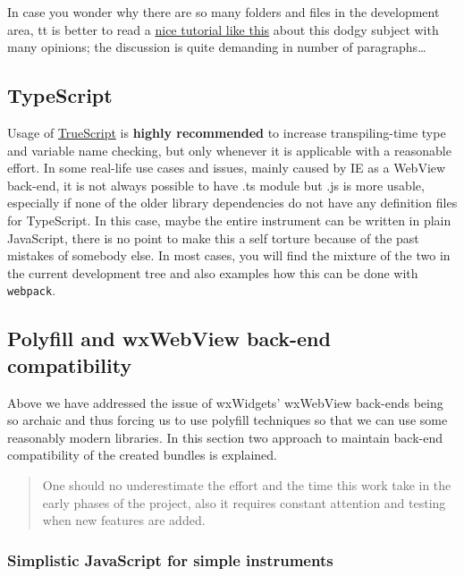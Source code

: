 \documentclass[11pt]{article}
\begin{document}
    In case you wonder why there are so many folders and files in the
development area, tt is better to read a
\href{https://medium.com/dev-bits/everything-i-know-about-writing-modular-javascript-applications-37c125d8eddf}{nice
tutorial like this} about this dodgy subject with many opinions; the
discussion is quite demanding in number of paragraphs\ldots{}

    \hypertarget{typescript}{%
\subsection{TypeScript}\label{typescript}}

    Usage of \href{https://www.typescriptlang.org/}{TrueScript} is
\textbf{highly recommended} to increase transpiling-time type and
variable name checking, but only whenever it is applicable with a
reasonable effort. In some real-life use cases and issues, mainly caused
by IE as a WebView back-end, it is not always possible to have .ts
module but .js is more usable, especially if none of the older library
dependencies do not have any definition files for TypeScript. In this
case, maybe the entire instrument can be written in plain JavaScript,
there is no point to make this a self torture because of the past
mistakes of somebody else. In most cases, you will find the mixture of
the two in the current development tree and also examples how this can
be done with \texttt{webpack}.

    \hypertarget{polyfill-and-wxwebview-back-end-compatibility}{%
\subsection{Polyfill and wxWebView back-end
compatibility}\label{polyfill-and-wxwebview-back-end-compatibility}}

    Above we have addressed the issue of wxWidgets' wxWebView back-ends
being so archaic and thus forcing us to use polyfill techniques so that
we can use some reasonably modern libraries. In this section two
approach to maintain back-end compatibility of the created bundles is
explained.

    \begin{quote}
One should no underestimate the effort and the time this work take in
the early phases of the project, also it requires constant attention and
testing when new features are added.
\end{quote}

    \hypertarget{simplistic-javascript-for-simple-instruments}{%
\subsubsection{Simplistic JavaScript for simple
instruments}\label{simplistic-javascript-for-simple-instruments}}
\end{document}
